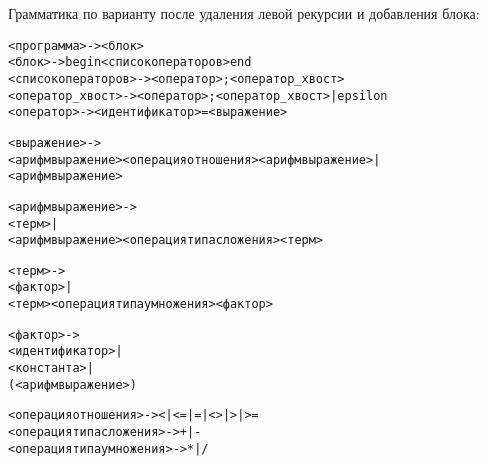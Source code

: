 Грамматика по варианту после удаления левой рекурсии и добавления блока:

\begin{framed}
\ttfamily 
\begin{alltt}
<программа> -> <блок>
<блок> -> begin <список операторов> end
<список операторов> -> <оператор> ; <оператор_хвост>
<оператор_хвост> -> <оператор> ; <оператор_хвост> | epsilon
<оператор> -> <идентификатор> = <выражение>

<выражение> -> 
    <арифм выражение> <операция отношения> <арифм выражение> | 
    <арифм выражение> 

<арифм выражение> -> 
    <терм> | 
    <арифм выражение> <операция типа сложения> <терм>   

<терм> -> 
    <фактор> | 
    <терм> <операция типа умножения> <фактор>

<фактор> -> 
    <идентификатор> | 
    <константа> | 
    ( <арифм выражение> )

<операция отношения> -> < | <= | = | <> | > | >= 
<операция типа сложения> -> + | - 
<операция типа умножения> -> * | / 
\end{alltt}
\end{framed}

\newpage